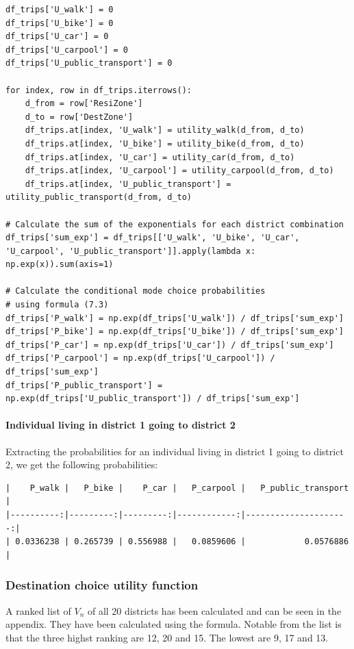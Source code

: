 \documentclass[a4paper,12pt]{article}
\begin{document}
\begin{verbatim}
df_trips['U_walk'] = 0
df_trips['U_bike'] = 0
df_trips['U_car'] = 0
df_trips['U_carpool'] = 0
df_trips['U_public_transport'] = 0

for index, row in df_trips.iterrows():
    d_from = row['ResiZone']
    d_to = row['DestZone']
    df_trips.at[index, 'U_walk'] = utility_walk(d_from, d_to)
    df_trips.at[index, 'U_bike'] = utility_bike(d_from, d_to)
    df_trips.at[index, 'U_car'] = utility_car(d_from, d_to)
    df_trips.at[index, 'U_carpool'] = utility_carpool(d_from, d_to)
    df_trips.at[index, 'U_public_transport'] = utility_public_transport(d_from, d_to)

# Calculate the sum of the exponentials for each district combination
df_trips['sum_exp'] = df_trips[['U_walk', 'U_bike', 'U_car', 'U_carpool', 'U_public_transport']].apply(lambda x: np.exp(x)).sum(axis=1)

# Calculate the conditional mode choice probabilities
# using formula (7.3)
df_trips['P_walk'] = np.exp(df_trips['U_walk']) / df_trips['sum_exp']
df_trips['P_bike'] = np.exp(df_trips['U_bike']) / df_trips['sum_exp']
df_trips['P_car'] = np.exp(df_trips['U_car']) / df_trips['sum_exp']
df_trips['P_carpool'] = np.exp(df_trips['U_carpool']) / df_trips['sum_exp']
df_trips['P_public_transport'] = np.exp(df_trips['U_public_transport']) / df_trips['sum_exp']
\end{verbatim}

\paragraph{Individual living in district 1 going to district 2}
Extracting the probabilities for an individual living in district 1 going to district 2, we get the following probabilities:
\begin{verbatim}
|    P_walk |   P_bike |    P_car |   P_carpool |   P_public_transport |
|----------:|---------:|---------:|------------:|---------------------:|
| 0.0336238 | 0.265739 | 0.556988 |   0.0859606 |            0.0576886 |
\end{verbatim}


\subsubsection{Destination choice utility function}
A ranked list of $V_n$ of all 20 districts has been calculated and can be seen in the appendix.
They have been calculated using the formula.
Notable from the list is that the three highst ranking are 12, 20 and 15.
The lowest are 9, 17 and 13.
\end{document}

